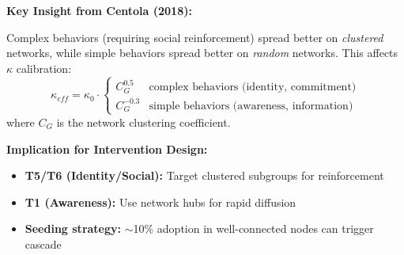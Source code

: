 \begin{tcolorbox}[colback=blue!5!white, colframe=blue!75!black,
    title=\textbf{Extension UNTCM-X1: Network-Dependent Feedback}]
\textbf{Key Insight from Centola (2018):}

Complex behaviors (requiring social reinforcement) spread better on \emph{clustered} networks, while simple behaviors spread better on \emph{random} networks. This affects $\kappa$ calibration:
\begin{equation}
\kappa_{eff} = \kappa_0 \cdot \begin{cases}
C_G^{0.5} & \text{complex behaviors (identity, commitment)} \\
C_G^{-0.3} & \text{simple behaviors (awareness, information)}
\end{cases}
\end{equation}
where $C_G$ is the network clustering coefficient.

\textbf{Implication for Intervention Design:}

\begin{itemize}[nosep]
\item \textbf{T5/T6 (Identity/Social):} Target clustered subgroups for reinforcement
\item \textbf{T1 (Awareness):} Use network hubs for rapid diffusion
\item \textbf{Seeding strategy:} $\sim$10\% adoption in well-connected nodes can trigger cascade
\end{itemize}

\end{tcolorbox}

